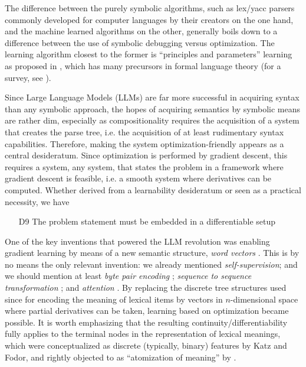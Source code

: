\documentclass[output=paper]{langscibook}
\begin{document}
The difference between the purely symbolic algorithms, such as lex/yacc
par\-sers commonly developed for computer languages by their creators on the
one hand, and the machine learned algorithms on the other, generally boils down
to a difference between the use of symbolic debugging versus optimization. The
learning algorithm closest to the former is ``principles and parameters'' 
learning as proposed in \citet{Chomsky:1993}, which has many precursors in
formal language theory (for a survey, see \cite{Angluin:1980}).

Since Large Language Models (LLMs) are far more successful in acquiring syntax than any symbolic
approach, the hopes of acquiring semantics by symbolic means are rather dim,
especially as compositionality requires the acquisition of a system that
creates the parse tree, i.e. the acquisition of at least rudimentary syntax
capabilities. Therefore, making the system optimization-friendly appears as a
central desideratum. Since optimization is performed by gradient descent, this
requires a system, any system, that states the problem in a framework where
gradient descent is feasible, i.e. a smooth system where derivatives can
be computed. Whether derived from a learnability desideratum or seen as a
practical necessity, we have

\begin{itemize}
\item[D9] The problem statement must be embedded in a differentiable setup
\end{itemize}

One of the key inventions that powered the LLM revolution was enabling
gradient learning by means of a new semantic structure, \textit{word vectors}
\citep{Schutze:1993,Collobert:2011}. This is by no means the only relevant
invention: we already mentioned \textit{self-supervision}; and we should mention
at least \textit{byte pair encoding} \citep{Gage:1994}; \textit{sequence to sequence
  transformation} \citep{Sutskever:2014}; and \textit{attention}
\citep{Vaswani:2017}. By replacing the discrete tree structures used since
\citet{Katz:1963} for encoding the meaning of lexical items by vectors in
$n$-dimensional space where partial derivatives can be taken, learning based
on optimization became possible. It is worth emphasizing that the resulting
continuity/differentiability fully applies to the terminal nodes in the
representation of lexical meanings, which were conceptualized as discrete
(typically, binary) features by Katz and Fodor, and rightly objected to as
``atomization of meaning'' by \citet{Bolinger:1965b}. 
\end{document}
